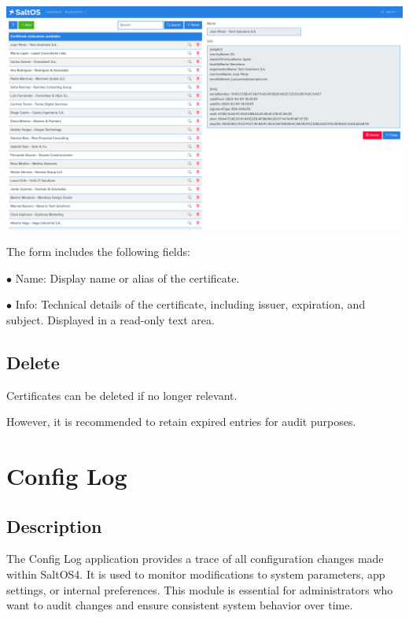 \documentclass[a4paper]{article}
\begin{document}
\begin{center}\includegraphics[width=1\textwidth]{../ujest/snaps/test-screenshots-js-screenshots-certs-certs-view-ab-877-d-2027-f-7-c-71-d-9935999-cce-1-b-802-b-en-us-1-snap.png}\end{center}

The form includes the following fields:

\begin{compactitem}
\item[\color{myblue}$\bullet$] Name: Display name or alias of the certificate.
\item[\color{myblue}$\bullet$] Info: Technical details of the certificate, including issuer, expiration, and subject. Displayed in a read-only text area.
\end{compactitem}

\hypertarget{toc5}{}
\subsection{Delete}

Certificates can be deleted if no longer relevant.

However, it is recommended to retain expired entries for audit purposes.


\hypertarget{toc6}{}
\section{Config Log}

\hypertarget{toc7}{}
\subsection{Description}

The Config Log application provides a trace of all configuration changes made within SaltOS4.
It is used to monitor modifications to system parameters, app settings, or internal preferences.
This module is essential for administrators who want to audit changes and ensure consistent system behavior over time.
\end{document}
